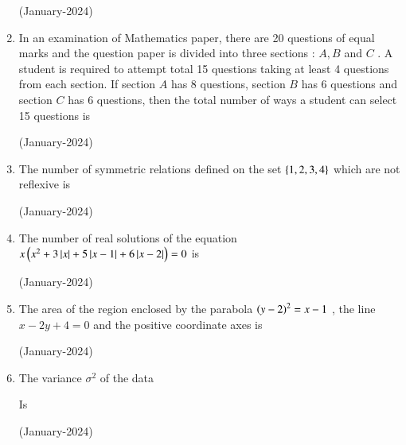 \documentclass[journal]{IEEEtran}
\begin{document}
\begin{enumerate}
 \hfill(January-2024)

 \item In an examination of Mathematics paper, there are 20 questions of equal marks and the question paper is divided into three sections : $A,B$
 and $C$
. A student is required to attempt total 15 questions taking at least 4 questions from each section. If section $A$
 has 8 questions, section $B$
 has 6 questions and section $C$
 has 6 questions, then the total number of ways a student can select 15 questions is 

 \hfill(January-2024)

 \item The number of symmetric relations defined on the set $\left\{1,2,3,4\right\}$
 which are not reflexive is 

 \hfill(January-2024)

 \item The number of real solutions of the equation $x\left(x^2 + 3\left\vert x\right\vert + 5\left\vert x-1\right\vert + 6 \left\vert x-2\right\vert\right) = 0$
 is 

 \hfill (January-2024)

 \item The area of the region enclosed by the parabola $\left(y-2\right)^2 = x -1 $
, the line $x - 2y + 4 = 0$
 and the positive coordinate axes is

 \hfill (January-2024)

 \item The variance $\sigma^2 $ of the data
 \begin{table}[h!]
     \centering
     
 \end{table} 
 
 Is

 \hfill (January-2024)
\end{enumerate}
\end{document}
